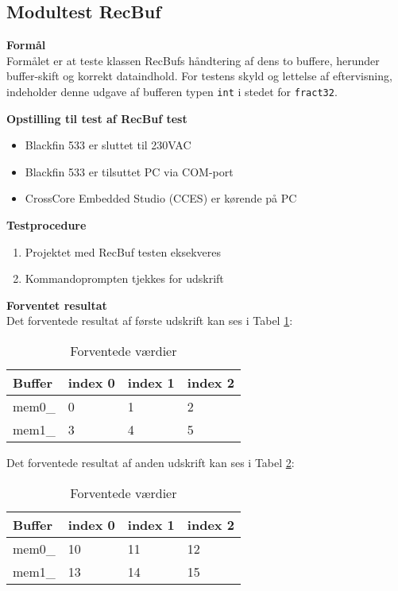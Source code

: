 \subsection{Modultest RecBuf}

\textbf{Formål} \\
Formålet er at teste klassen RecBufs håndtering af dens to buffere, herunder buffer-skift og korrekt dataindhold. For testens skyld og lettelse af eftervisning, indeholder denne udgave af bufferen typen \verb+int+ i stedet for \verb+fract32+.

\textbf{Opstilling til test af RecBuf test}

\begin{itemize}
	\item Blackfin 533 er sluttet til 230VAC
	\item Blackfin 533 er tilsuttet PC via COM-port
	\item CrossCore Embedded Studio (CCES) er kørende på PC
\end{itemize}

\textbf{Testprocedure}
\begin{enumerate}
	\item Projektet med RecBuf testen eksekveres 
	\item Kommandoprompten tjekkes for udskrift 
\end{enumerate}

\textbf{Forventet resultat} \\
Det forventede resultat af første udskrift kan ses i Tabel \ref{IL:modultest:values1}:

\begin{table}[H]
	\caption{Forventede værdier }
\begin{center}
    \begin{tabular}{ | l | l | l | l |}
    \hline 
    \textbf{Buffer} 	& \textbf{index 0}  &\textbf{index 1}	&\textbf{index 2}  	\\ \hline
     mem0\_	 	& 0   				& 1				& 2			\\ \hline
     mem1\_ 	& 3  				& 4 			& 5				\\ \hline
    \end{tabular}
\end{center}
	\label{IL:modultest:values1}
\end{table}

Det forventede resultat af anden udskrift kan ses i Tabel \ref{IL:modultest:values2}:

\begin{table}[H]
	\caption{Forventede værdier }
\begin{center}
    \begin{tabular}{ | l | l | l | l |}
    \hline 
    \textbf{Buffer} 	& \textbf{index 0}  &\textbf{index 1}	&\textbf{index 2}  	\\ \hline
     mem0\_	 	& 10   				& 11				& 12			\\ \hline
     mem1\_ 	& 13  				& 14 			& 15				\\ \hline
    \end{tabular}
\end{center}
	\label{IL:modultest:values2}
\end{table}

